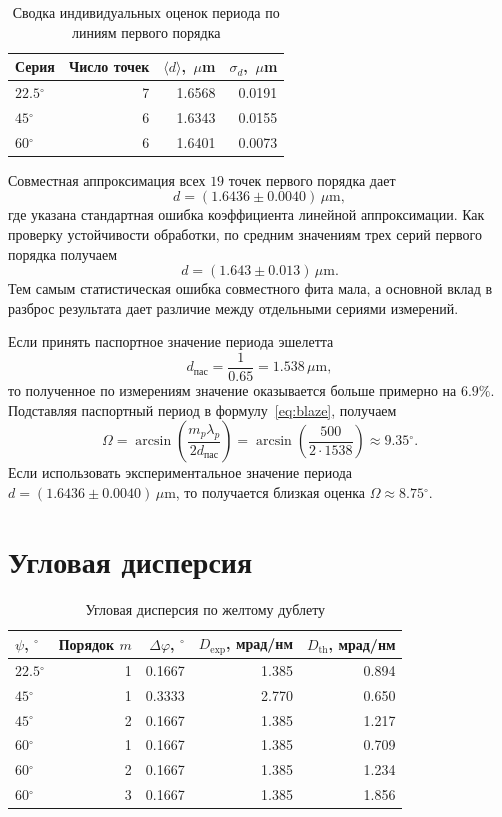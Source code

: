 \documentclass[twoside]{mfitjournal}
\newcommand{\degree}{\ensuremath{^\circ}}
\begin{document}
\begin{table}[h]
\centering
\caption{Сводка индивидуальных оценок периода по линиям первого порядка}
\begin{tabular}{@{}lrrr@{}}
\toprule
Серия & Число точек & $\langle d \rangle$, \,$\mu$m & $\sigma_d$, \,$\mu$m \\ \midrule
$22.5\degree$ & 7 & 1.6568 & 0.0191 \\
$45\degree$ & 6 & 1.6343 & 0.0155 \\
$60\degree$ & 6 & 1.6401 & 0.0073 \\
\bottomrule
\end{tabular}
\end{table}

Совместная аппроксимация всех $19$ точек первого порядка дает
\[
d = (1.6436 \pm 0.0040)\,\mu\text{m},
\]
где указана стандартная ошибка коэффициента линейной аппроксимации. Как
проверку устойчивости обработки, по средним значениям трех серий первого
порядка получаем
\[
d = (1.643 \pm 0.013)\,\mu\text{m}.
\]
Тем самым статистическая ошибка совместного фита мала, а основной вклад в
разброс результата дает различие между отдельными сериями измерений.

Если принять паспортное значение периода эшелетта
\[
d_{\text{пас}} = \frac{1}{0.65} = 1.538\,\mu\text{m},
\]
то полученное по измерениям значение оказывается больше примерно на $6.9\%$.
Подставляя паспортный период в формулу~\eqref{eq:blaze}, получаем
\[
\Omega = \arcsin\left(\frac{m_p\lambda_p}{2d_{\text{пас}}}\right)
= \arcsin\left(\frac{500}{2\cdot1538}\right)\approx 9.35\degree.
\]
Если использовать экспериментальное значение периода
$d=(1.6436\pm0.0040)\,\mu\text{m}$, то получается близкая оценка
$\Omega \approx 8.75\degree$.

\section*{Угловая дисперсия}
\begin{table}[h]
\centering
\caption{Угловая дисперсия по желтому дублету}
\begin{tabular}{@{}lrrrr@{}}
\toprule
$\psi$, \degree & Порядок $m$ & $\Delta\varphi$, \degree & $D_{\text{exp}}$, мрад/нм & $D_{\text{th}}$, мрад/нм \\ \midrule
$22.5\degree$ & 1 & 0.1667 & 1.385 & 0.894 \\
$45\degree$ & 1 & 0.3333 & 2.770 & 0.650 \\
$45\degree$ & 2 & 0.1667 & 1.385 & 1.217 \\
$60\degree$ & 1 & 0.1667 & 1.385 & 0.709 \\
$60\degree$ & 2 & 0.1667 & 1.385 & 1.234 \\
$60\degree$ & 3 & 0.1667 & 1.385 & 1.856 \\
\bottomrule
\end{tabular}
\end{table}
\end{document}
